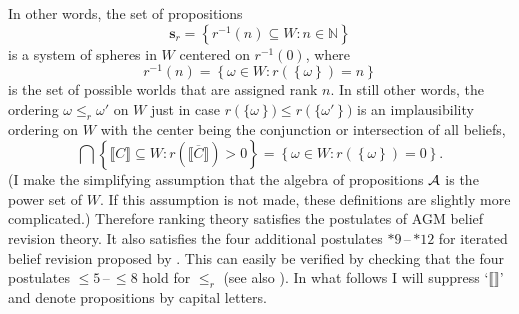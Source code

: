 In other words, the set of propositions
$$\textbf{s}_r=\left\{r^{-1}\left(n\right)\subseteq W:n\in\mathbb{N}\right\}$$
is a system of spheres in $W$ centered on $r^{-1}\left(0\right)$, where
$$r^{-1}\left(n\right)=\left\{\omega\in W:r\left(\left\{\omega\right\}\right)=n\right\}$$
is the set of possible worlds that are assigned rank $n$. In still other words, the ordering $\omega\leq_r \omega'$ on $W$ just in case $r\left(\{\omega\right\})\leq r\left(\{\omega'\right\})$
is an implausibility ordering on $W$ with the center being the conjunction or intersection of all beliefs, $$\bigcap\left\{\llbracket C\rrbracket\subseteq W:r\left(\overline{\llbracket C\rrbracket}\right)>0\right\}=\left\{\omega\in W:r\left(\left\{\omega\right\}\right)=0\right\}.$$
(I make the simplifying assumption that the algebra of propositions $\cal A$ is the power set of $W$. If this assumption is not made, these definitions are slightly more complicated.) Therefore ranking theory satisfies the postulates of AGM belief revision theory. It also satisfies the four additional postulates $*9$\,--\,$*12$ for iterated belief revision proposed by \citet{dp97}. This can easily be verified by checking that the four postulates $\leq\!5$\,--\,$\leq\!8$ hold for $\leq_r$ (see also \citealt[chapter 5.6]{s12}). %
In what follows I will suppress `$\llbracket\rrbracket$' and denote propositions by capital letters.

